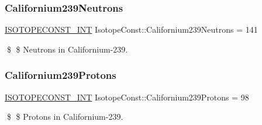 \subsubsection{\texorpdfstring{Californium239\+Neutrons}{Californium239Neutrons}}
{\footnotesize\ttfamily \mbox{\hyperlink{group___isotope_const-_macros_ga5f18360b3e99483a35c32d789e62621c}{I\+S\+O\+T\+O\+P\+E\+C\+O\+N\+S\+T\+\_\+\+I\+NT}} Isotope\+Const\+::\+Californium239\+Neutrons = 141}

\$ \$ Neutrons in Californium-\/239. \mbox{\label{group___isotope_const-_californium-_cf239_ga059a9fc363a471f474cc8db4d61bd67f}} 
\subsubsection{\texorpdfstring{Californium239\+Protons}{Californium239Protons}}
{\footnotesize\ttfamily \mbox{\hyperlink{group___isotope_const-_macros_ga5f18360b3e99483a35c32d789e62621c}{I\+S\+O\+T\+O\+P\+E\+C\+O\+N\+S\+T\+\_\+\+I\+NT}} Isotope\+Const\+::\+Californium239\+Protons = 98}

\$ \$ Protons in Californium-\/239. 